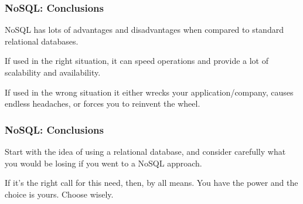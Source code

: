 \begin{frame}
\frametitle{NoSQL: Conclusions}

NoSQL has lots of advantages and disadvantages when compared to standard relational databases. 

If used in the right situation, it can speed operations and provide a lot of scalability and availability.

 If used in the wrong situation it either wrecks your application/company, causes endless headaches, or forces you to reinvent the wheel.
 
 \end{frame}



\begin{frame}
\frametitle{NoSQL: Conclusions}

 
 Start with the idea of using a relational database, and consider carefully what you would be losing if you went to a NoSQL approach.
 
  If it's the right call for this need, then, by all means. You have the power and the choice is yours. Choose wisely.


\end{frame}






